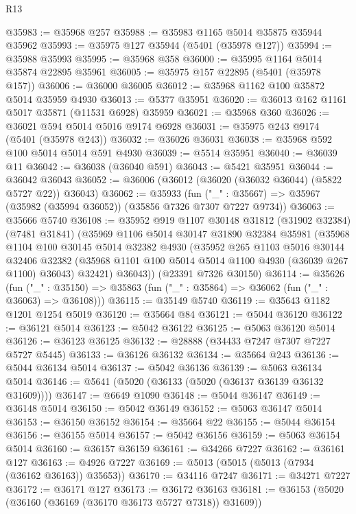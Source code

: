 \begin{lexlean}{R13}
\begin{coremodule}
@35983 := @35968 @257
@35988 := @35983 @1165 @5014 @35875 @35944 @35962
@35993 := @35975 @127 @35944 (@5401 (@35978 @127))
@35994 := @35988 @35993
@35995 := @35968 @358
@36000 := @35995 @1164 @5014 @35874 @22895 @35961
@36005 := @35975 @157 @22895 (@5401 (@35978 @157))
@36006 := @36000 @36005
@36012 := @35968 @1162 @100 @35872 @5014 @35959 @4930
@36013 := @5377 @35951
@36020 := @36013 @162 @1161 @5017 @35871 (@11531 @6928) @35959
@36021 := @35968 @360
@36026 := @36021 @594 @5014 @5016 @9174 @6928
@36031 := @35975 @243 @9174 (@5401 (@35978 @243))
@36032 := @36026 @36031
@36038 := @35968 @592 @100 @5014 @5014 @591 @4930
@36039 := @5514 @35951
@36040 := @36039 @11
@36042 := @36038 (@36040 @591)
@36043 := @5421 @35951
@36044 := @36042 @36043
@36052 := @36006 (@36012 (@36020 (@36032 @36044) (@5822 @5727 @22)) @36043)
@36062 := @35933
    (fun ("_" : @35667) => @35967 (@35982 (@35994 @36052)) (@35856 @7326 @7307 @7227 @9734))
@36063 := @35666 @5740
@36108 := @35952
    @919
    @1107
    @30148
    @31812
    (@31902 @32384)
    (@7481 @31841)
    (@35969
      @1106
      @5014
      @30147
      @31890
      @32384
      @35981
      (@35968
        @1104
        @100
        @30145
        @5014
        @32382
        @4930
        (@35952
          @265
          @1103
          @5016
          @30144
          @32406
          @32382
          (@35968 @1101 @100 @5014 @5014 @1100 @4930 (@36039 @267 @1100) @36043)
          @32421)
        @36043))
    (@23391 @7326 @30150)
@36114 := @35626
    (fun ("_" : @35150) => @35863 (fun ("_" : @35864) => @36062 (fun ("_" : @36063) => @36108)))
@36115 := @35149 @5740
@36119 := @35643 @1182 @1201 @1254 @5019
@36120 := @35664 @84
@36121 := @5044 @36120
@36122 := @36121 @5014
@36123 := @5042 @36122
@36125 := @5063 @36120 @5014
@36126 := @36123 @36125
@36132 := @28888 (@34433 @7247 @7307 @7227 @5727 @5445)
@36133 := @36126 @36132
@36134 := @35664 @243
@36136 := @5044 @36134 @5014
@36137 := @5042 @36136
@36139 := @5063 @36134 @5014
@36146 := @5641 (@5020 (@36133 (@5020 (@36137 @36139 @36132 @31609))))
@36147 := @6649 @1090
@36148 := @5044 @36147
@36149 := @36148 @5014
@36150 := @5042 @36149
@36152 := @5063 @36147 @5014
@36153 := @36150 @36152
@36154 := @35664 @22
@36155 := @5044 @36154
@36156 := @36155 @5014
@36157 := @5042 @36156
@36159 := @5063 @36154 @5014
@36160 := @36157 @36159
@36161 := @34266 @7227
@36162 := @36161 @127
@36163 := @4926 @7227
@36169 := @5013 (@5015 (@5013 (@7934 (@36162 @36163)) @35653))
@36170 := @34116 @7247
@36171 := @34271 @7227
@36172 := @36171 @127
@36173 := @36172 @36163
@36181 := @36153 (@5020 (@36160 (@36169 (@36170 @36173 @5727 @7318)) @31609))

\end{coremodule}
\end{lexlean}
